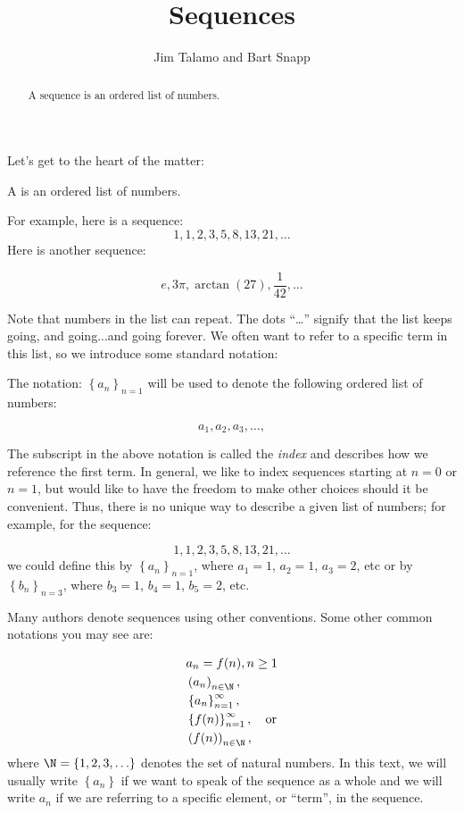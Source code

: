 \documentclass{ximera}
\author{Jim Talamo and Bart Snapp}
\title[Dig-In:]{Sequences}
\begin{document}
\begin{abstract}
  A sequence is an ordered list of numbers.
\end{abstract}
\maketitle


Let's get to the heart of the matter:

\begin{definition}
  A  is an ordered list of numbers.
\end{definition}

For example, here is a sequence:
\[
1,1, 2, 3, 5, 8, 13, 21, \ldots
\]
Here is another sequence:

\[
e, 3\pi, \arctan(27), \frac{1}{42}, \ldots
\]


Note that numbers in the list can repeat.  The dots ``\ldots'' signify that the list keeps
going, and going...and going forever.  We often want to refer to a specific term in this list, so we introduce some standard notation:
\begin{definition} The notation:  $\left\{a_n\right\}_{n=1}$ will be used to denote the following ordered list of numbers:

\[
a_1, a_2,  a_3, \ldots,
\]
\end{definition}

The subscript in the above notation is called the \emph{index} and describes how we reference the first term.  In general, we like to index sequences starting at $n=0$ or $n=1$, but would like to have the freedom to make other choices should it be convenient.  Thus, there is no unique way to describe a given list of numbers; for example, for the sequence:

\[
1,1, 2, 3, 5, 8, 13, 21, \ldots
\]
we could define this by $\left\{a_n\right\}_{n=1}$, where $a_1=1$, $a_2=1$, $a_3=2$, etc or by  $\left\{b_n\right\}_{n=3}$, where $b_3=1$, $b_4=1$, $b_5=2$, etc.

\begin{remark}
Many authors denote sequences using other conventions.  Some other common notations you may see are: 

\begin{align*}
  &a_n = f(n), n \geq 1   \\
  & \left(a_n\right)_{n \in \N}, \\
  & \left\{a_n\right\}_{n=1}^\infty, \\
  & \left\{f(n)\right\}_{n=1}^\infty, \quad \text{or} \\
  & \left(f(n)\right)_{n \in \N},
\end{align*}
where $\N = \{1,2,3, \ldots \}$ denotes the set of natural  numbers. In this text, we will usually write $\left\{a_n\right\}$ if we want to speak of the sequence as a whole and we will write $a_n$ if we are referring to a specific element, or ``term'', in the sequence.

\end{remark}
\end{document}
